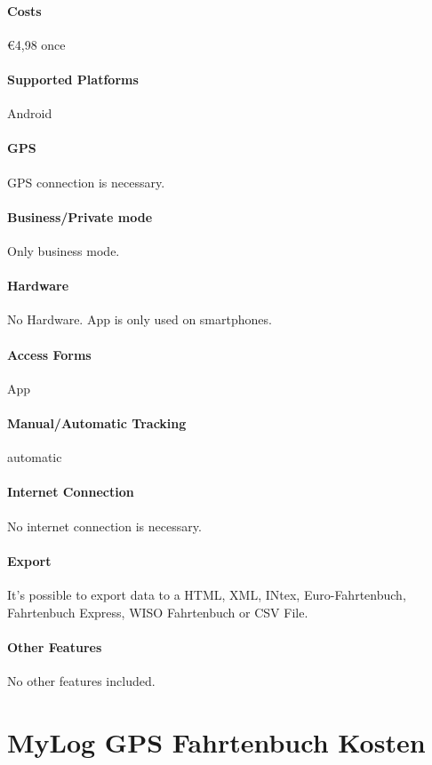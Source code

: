 \paragraph{Costs} \euro 4,98 once
\paragraph{Supported Platforms} Android 
\paragraph{GPS} GPS connection is necessary.
\paragraph{Business/Private mode} Only business mode.
\paragraph{Hardware} No Hardware. App is only used on smartphones.
\paragraph{Access Forms} App
\paragraph{Manual/Automatic Tracking} automatic
\paragraph{Internet Connection} No internet connection is necessary.
\paragraph{Export} It’s possible to export data to a HTML, XML, INtex, Euro-Fahrtenbuch, Fahrtenbuch Express, WISO Fahrtenbuch or CSV File.
\paragraph{Other Features} No other features included.
\newpage

\section{MyLog GPS Fahrtenbuch Kosten}
